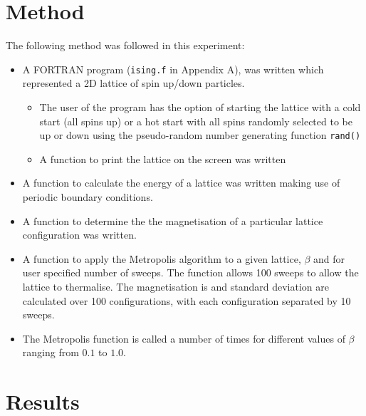\documentclass[a4paper]{IEEEtran}
\begin{document}
\section{Method}
    The following method was followed in this experiment:
    \begin{itemize}
        \item A FORTRAN program (\texttt{ising.f} in Appendix A), was
              written which represented a 2D lattice of spin up/down 
              particles.
            \begin{itemize}
                \item The user of the program has the option of
                      starting the lattice with a cold start
                      (all spins up) or a hot start with all 
                      spins randomly selected to be up or down
                      using the pseudo-random number 
                      generating function \texttt{rand()} 
                \item A function to print the lattice on the screen
                      was written
            \end{itemize}
        \item A function to calculate the energy of a lattice was
              written making use of periodic boundary conditions.
        \item A function to determine the the magnetisation of 
              a particular lattice configuration was written.
        \item A function to apply the Metropolis algorithm to a given
              lattice, $\beta$ and for user specified number of sweeps.
              The function allows 100 sweeps to allow the lattice
              to thermalise.
              The magnetisation is and standard deviation are calculated
              over 100 configurations, with each configuration separated 
              by 10 sweeps.
        \item The Metropolis function is called a number of times
              for different values of $\beta$ ranging from $0.1$ 
              to $1.0$.
    \end{itemize}


\section{Results}
\end{document}
